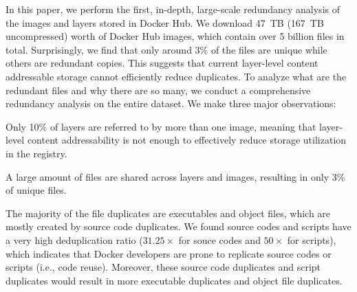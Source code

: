 In this paper, we perform the first, in-depth, large-scale redundancy
analysis of the images and layers stored in Docker Hub.
%
We download 47~TB (167~TB uncompressed) worth of Docker Hub images,
%
%
which contain over 5 billion files in total.
%
%
%
%
Surprisingly, we find that only around 3\% of the files are unique
while others are redundant copies. This suggests that current layer-level content
addressable storage cannot efficiently reduce duplicates.
%
To analyze what are the redundant files and why there are so many,
we conduct a comprehensive redundancy analysis on the entire dataset.
%
We make three major observations:
%
\begin{compactitemize}
%
\item Only 10\% of layers are referred to by more than one image, 
meaning that layer-level content addressability is not enough to
effectively reduce storage utilization in the registry.
%
\item A large amount of files are shared across layers and images,
resulting in only 3\% of unique files.
%
\item {}
The majority of the file duplicates are executables and object files, which are
mostly created by source code duplicates.
	We found source codes and scripts have a very high deduplication ratio (\textbf{$31.25\times$} for souce codes and \textbf{$50\times$} for scripts), which indicates that Docker developers are prone to replicate source codes or scripts (i.e., code reuse). Moreover, these source code duplicates and script duplicates would result in more executable duplicates and object file duplicates.

\end{compactitemize}

